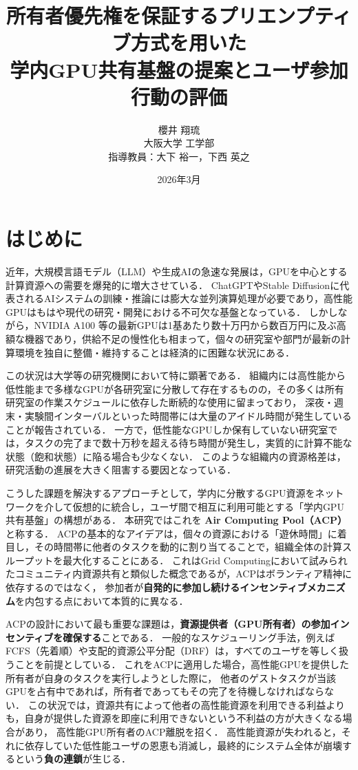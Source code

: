 \documentclass[12pt,a4paper]{jsarticle}
\title{
  \Large 所有者優先権を保証するプリエンプティブ方式を用いた\\
  学内GPU共有基盤の提案とユーザ参加行動の評価
  \vspace{1em}
}
\author{
  櫻井 翔琉\\
  大阪大学 工学部\\
  指導教員：大下 裕一，下西 英之
}
\date{2026年3月}
\begin{document}
\maketitle
\tableofcontents
\newpage

\section{はじめに}

近年，大規模言語モデル（LLM）や生成AIの急速な発展は，GPUを中心とする計算資源への需要を爆発的に増大させている\cite{lecun2015deep,brown2020language}．
ChatGPTやStable Diffusionに代表されるAIシステムの訓練・推論には膨大な並列演算処理が必要であり，高性能GPUはもはや現代の研究・開発における不可欠な基盤となっている．
しかしながら，NVIDIA A100 等の最新GPUは1基あたり数十万円から数百万円に及ぶ高額な機器であり，供給不足の慢性化も相まって，個々の研究室や部門が最新の計算環境を独自に整備・維持することは経済的に困難な状況にある\cite{hooker2021hardware}．

この状況は大学等の研究機関において特に顕著である．
組織内には高性能から低性能まで多様なGPUが各研究室に分散して存在するものの，その多くは所有研究室の作業スケジュールに依存した断続的な使用に留まっており，
深夜・週末・実験間インターバルといった時間帯には大量のアイドル時間が発生していることが報告されている\cite{jeon2019analysis}．
一方で，低性能なGPUしか保有していない研究室では，タスクの完了まで数十万秒を超える待ち時間が発生し，実質的に計算不能な状態（飽和状態）に陥る場合も少なくない．
このような組織内の資源格差は，研究活動の進展を大きく阻害する要因となっている\cite{armbrust2010view,buyya2009cloud}．

こうした課題を解決するアプローチとして，学内に分散するGPU資源をネットワークを介して仮想的に統合し，ユーザ間で相互に利用可能とする「学内GPU共有基盤」の構想がある．
本研究ではこれを \textbf{Air Computing Pool（ACP）}と称する．
ACPの基本的なアイデアは，個々の資源における「遊休時間」に着目し，その時間帯に他者のタスクを動的に割り当てることで，組織全体の計算スループットを最大化することにある．
これはGrid Computingにおいて試みられたコミュニティ内資源共有と類似した概念であるが，ACPはボランティア精神に依存するのではなく，
参加者が\textbf{自発的に参加し続けるインセンティブメカニズム}を内包する点において本質的に異なる．

ACPの設計において最も重要な課題は，\textbf{資源提供者（GPU所有者）の参加インセンティブを確保する}ことである．
一般的なスケジューリング手法，例えばFCFS（先着順）や支配的資源公平分配（DRF）は，すべてのユーザを等しく扱うことを前提としている\cite{ghodsi2011dominant}．
これをACPに適用した場合，高性能GPUを提供した所有者が自身のタスクを実行しようとした際に，
他者のゲストタスクが当該GPUを占有中であれば，所有者であってもその完了を待機しなければならない．
この状況では，資源共有によって他者の高性能資源を利用できる利益よりも，自身が提供した資源を即座に利用できないという不利益の方が大きくなる場合があり，
高性能GPU所有者のACP離脱を招く．
高性能資源が失われると，それに依存していた低性能ユーザの恩恵も消滅し，最終的にシステム全体が崩壊するという\textbf{負の連鎖}が生じる\cite{feldman2004robust}．
\end{document}
